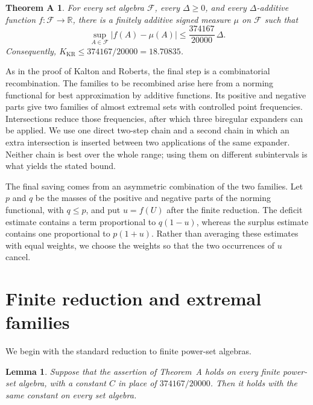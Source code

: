 \documentclass[11pt,a4paper]{amsart}
\newtheorem{lemma}[theorem]{Lemma}
\newtheorem*{theoremA}{Theorem A}
\newcommand{\cF}{\mathcal F}
\newcommand{\KR}{K_{\mathrm{KR}}}
\newcommand{\RR}{\mathbb R}
\begin{document}
\begin{theoremA}
For every set algebra \(\cF\), every \(\Delta\geqslant0\), and every
\(\Delta\)-additive function \(f\colon\cF\to\RR\), there is a finitely
additive signed measure \(\mu\) on \(\cF\) such that
\[
        \sup_{A\in\cF}\lvert f(A)-\mu(A)\rvert
        \leqslant \frac{374167}{20000}\,\Delta.
\]
Consequently, \(\KR\leqslant374167/20000=18.70835\).
\end{theoremA}

As in the proof of Kalton and Roberts, the final step is a combinatorial
recombination.  The families to be recombined arise here from a norming
functional for best approximation by additive functions.  Its positive and
negative parts give two families of almost extremal sets with controlled point
frequencies.  Intersections reduce those frequencies, after which three
biregular expanders can be applied.  We use one direct two-step chain
and a second chain in which an extra intersection is inserted between two
applications of the same expander.  Neither chain is best over the whole
range; using them on different subintervals is what yields the stated bound.

The final saving comes from an asymmetric combination of the two families.
Let \(p\) and \(q\) be the masses of the positive and negative parts of the
norming functional, with \(q\leqslant p\), and put \(u=f(U)\) after the
finite reduction.  The deficit estimate contains a
term proportional to \(q(1-u)\), whereas the surplus estimate contains one
proportional to \(p(1+u)\).  Rather than averaging these estimates with equal
weights, we choose the weights so that the two occurrences of \(u\) cancel.

\section{Finite reduction and extremal families}

We begin with the standard reduction to finite power-set algebras.

\begin{lemma}\label{lem:finite-reduction}
Suppose that the assertion of Theorem~A holds on every finite power-set
algebra, with a constant \(C\) in place of \(374167/20000\).  Then it holds with
the same constant on every set algebra.
\end{lemma}
\end{document}
